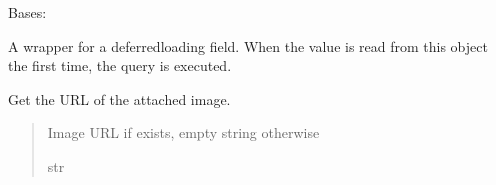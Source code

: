 \documentclass[letterpaper,10pt,english]{sphinxmanual}
\begin{document}
\begin{fulllineitems}

\begin{fulllineitems}
\label{\detokenize{pages_app.models:pages_app.models.block.Block.MultipleObjectsReturned}}
\pysigstartsignatures
\pysigline
{}
\pysigstopsignatures
\sphinxAtStartPar
Bases: 

\end{fulllineitems}


\begin{fulllineitems}
\label{\detokenize{pages_app.models:pages_app.models.block.Block.created_at}}
\pysigstartsignatures
\pysigline
{}
\pysigstopsignatures
\sphinxAtStartPar
A wrapper for a deferred\sphinxhyphen{}loading field. When the value is read from this
object the first time, the query is executed.

\end{fulllineitems}


\begin{fulllineitems}
\label{\detokenize{pages_app.models:pages_app.models.block.Block.get_image_url}}
\pysigstartsignatures
\pysiglinewithargsret
{}
{}
{}
\pysigstopsignatures
\sphinxAtStartPar
Get the URL of the attached image.
\begin{quote}\begin{description}
\sphinxAtStartPar
Image URL if exists, empty string otherwise

\sphinxAtStartPar
str

\end{description}\end{quote}

\end{fulllineitems}



\end{fulllineitems}
\end{document}
